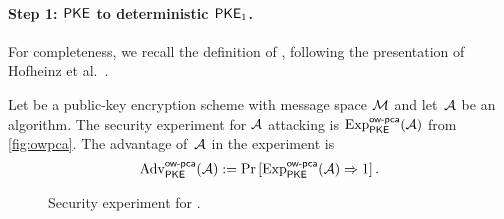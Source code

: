 \documentclass{iacrcc}
\begin{document}
\paragraph{Step 1: \INDCPA $\textsf{\upshape\mdseries PKE}$ to \OWPCA deterministic $\textsf{\upshape\mdseries PKE}_1$.}

For completeness, we recall the definition of \OWPCA, following the
presentation of Hofheinz et al.~\cite{TCC:HofHovKil17}.

\begin{definition}
  \label{def:OW-CPA}
  Let \PKE be a public-key encryption scheme with message space
  $\mathcal{M}$ and let~$\mathcal{A}$ be an algorithm.  The \OWPCA security
  experiment for $\mathcal{A}$ attacking \PKE is
  $\mathrm{Exp}^{\textsf{\upshape\mdseries \textsf{\upshape\mdseries ow-pca}}}_{\textsf{\upshape\mdseries PKE}}(\mathcal{A})$ from \autoref{fig:owpca}.  The
  advantage of~$\mathcal{A}$ in the experiment is
  \[
    \mathrm{Adv}^{\textsf{\upshape\mdseries \textsf{\upshape\mdseries ow-pca}}}_{\textsf{\upshape\mdseries PKE}}(\mathcal{A}) := \Pr\left[
      \mathrm{Exp}^{\textsf{\upshape\mdseries \textsf{\upshape\mdseries ow-pca}}}_{\textsf{\upshape\mdseries PKE}}(\mathcal{A}) \Rightarrow 1 \right].
  \]
\end{definition}

\begin{figure}[h]
	\centering
	\caption{Security experiment for \OWPCA.}
	\label{fig:owpca}
\end{figure}
\end{document}
